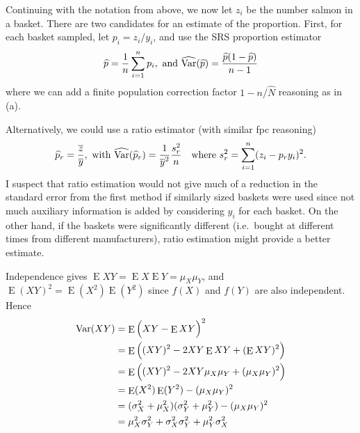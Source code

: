 \documentclass[usenames,dvipsnames]{homework}
\DeclareMathOperator{\E}{E}
\begin{document}

\begin{solution}
  Continuing with the notation from above, we now let $z_i$ be the number salmon in a basket.  There are two candidates for an estimate of the proportion.  First, for each basket sampled, let $p_i = z_i/y_i$, and use the SRS proportion estimator
  \begin{equation*}
    \widehat p = \frac 1n \sum_{i=1}^n p_i,\text{ and }\widehat{\mathrm{Var}}(\widehat p) = \frac{\widehat p(1-\widehat p)}{n-1}
  \end{equation*}
  where we can add a finite population correction factor $1-n / \hat N$ reasoning as in (a).

  Alternatively, we could use a ratio estimator (with similar fpc reasoning)
  \begin{equation*}
    \widehat p_{r} = \frac{\overline z}{\overline y},\text{ with }\widehat{\mathrm{Var}}(\widehat p_r) = \frac 1{\overline y^2} \frac{s_r^2}{n}\quad\text{where }s_r^2 = \sum_{i=1}^n(z_i - p_ry_i)^2.
  \end{equation*}
  I suspect that ratio estimation would not give much of a reduction in the standard error from the first method if similarly sized baskets were used since not much auxiliary information is added by considering $y_i$ for each basket.  On the other hand, if the baskets were significantly different (i.e.~bought at different times from different manufacturers), ratio estimation might provide a better estimate.
\end{solution}
\newpage
{}

\begin{solution}
  Independence gives $\E XY = \E X \E Y = \mu_X \mu_Y$, and $\E(XY)^2 = \E(X^2) \E(Y^2)$ since $f(X)$ and $f(Y)$ are also independent. Hence
  \begin{align*}
    \Var (XY) 
    &= \E\Big( XY - \E XY\Big)^2\\
    &= \E\Big( (XY)^2 -2 XY \E XY + (\E XY)^2 \Big)\\
    &= \E\Big( (XY)^2 -2 XY \mu_X\mu_Y + (\mu_X\mu_Y)^2 \Big)\\
    &= \E(X^2)\E(Y^2) - (\mu_X\mu_Y)^2 \\
    &= (\sigma_X^2 + \mu_X^2)(\sigma_Y^2 + \mu_Y^2) - (\mu_X\mu_Y)^2 \\
    &= \mu_X^2\sigma_Y^2 + \sigma_X^2\sigma_Y^2 + \mu_Y^2\sigma_X^2 
  \end{align*}
\end{solution} 
\end{document}
